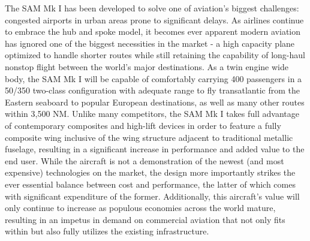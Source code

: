 The SAM Mk I has been developed to solve one of aviation's biggest challenges: congested airports in urban areas prone to significant delays.  As airlines continue to embrace the hub and spoke model, it becomes ever apparent modern aviation has ignored one of the biggest necessities in the market - a high capacity plane optimized to handle shorter routes while still retaining the capability of long-haul nonstop flight between the world's major destinations.  As a twin engine wide body, the SAM Mk I will be capable of comfortably carrying 400 passengers in a 50/350 two-class configuration with adequate range to fly transatlantic from the Eastern seaboard to popular European destinations, as well as many other routes within 3,500 NM.  Unlike many competitors, the SAM Mk I takes full advantage of contemporary composites and high-lift devices in order to feature a fully composite wing inclusive of the wing structure adjacent to traditional metallic fuselage, resulting in a significant increase in performance and added value to the end user.  While the aircraft is not a demonstration of the newest (and most expensive) technologies on the market, the design more importantly strikes the ever essential balance between cost and performance, the latter of which comes with significant expenditure of the former.  Additionally, this aircraft's value will only continue to increase as populous economies across the world mature, resulting in an impetus in demand on commercial aviation that not only fits within but also fully utilizes the existing infrastructure. 
\clearpage

